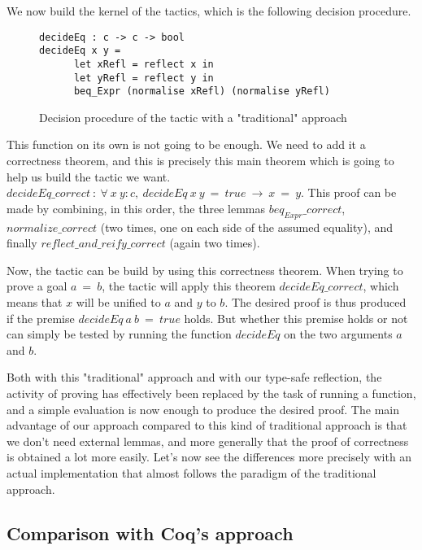 We now build the kernel of the tactics, which is the following decision procedure. 
\begin{figure}[H]
\figrule
\begin{center}
\begin{verbatim}
decideEq : c -> c -> bool 
decideEq x y =
      let xRefl = reflect x in 
      let yRefl = reflect y in
      beq_Expr (normalise xRefl) (normalise yRefl)
\end{verbatim}
\end{center}
\caption{Decision procedure of the tactic with a "traditional" approach}
\figrule
\end{figure}
This function on its own is not going to be enough. We need to add it a correctness theorem, and this is precisely this main theorem which is going to help us build the tactic we want.	
$decideEq\_correct\ :\ \forall\  x\ y:c,\ decideEq\ x\ y\ =\ true\ \rightarrow\ x\ =\ y$. This proof can be made by combining, in this order, the three lemmas $beq_{Expr}\_correct$, $normalize\_correct$ (two times, one on each side of the assumed equality), and finally $reflect\_and\_reify\_correct$ (again two times).

Now, the tactic can be build by using this correctness theorem. When trying to prove a goal $a\ =\ b$, the tactic will apply this theorem $decideEq\_correct$, which means that $x$ will be unified to $a$ and $y$ to $b$. The desired proof is thus produced if the premise $decideEq\ a\ b\ =\ true$ holds. But whether this premise holds or not can simply be tested by running the function $decideEq$ on the two arguments $a$ and $b$. 

Both with this "traditional" approach and with our type-safe reflection, the activity of proving has effectively been replaced by the task of running a function, and a simple evaluation is now enough to produce the desired proof. The main advantage of our approach compared to this kind of traditional approach is that we don't need external lemmas, and more generally that the proof of correctness is obtained a lot more easily. Let's now see the differences more precisely with an actual implementation that almost follows the paradigm of the traditional approach.

	\subsection {Comparison with Coq's approach}
	
